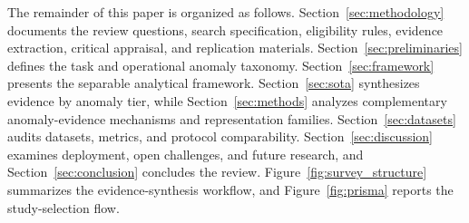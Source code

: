 \documentclass[10pt,a4paper]{article}
\begin{document}
The remainder of this paper is organized as follows. Section~\ref{sec:methodology} documents the review questions, search specification, eligibility rules, evidence extraction, critical appraisal, and replication materials. Section~\ref{sec:preliminaries} defines the task and operational anomaly taxonomy. Section~\ref{sec:framework} presents the separable analytical framework. Section~\ref{sec:sota} synthesizes evidence by anomaly tier, while Section~\ref{sec:methods} analyzes complementary anomaly-evidence mechanisms and representation families. Section~\ref{sec:datasets} audits datasets, metrics, and protocol comparability. Section~\ref{sec:discussion} examines deployment, open challenges, and future research, and Section~\ref{sec:conclusion} concludes the review. Figure~\ref{fig:survey_structure} summarizes the evidence-synthesis workflow, and Figure~\ref{fig:prisma} reports the study-selection flow.
\end{document}
